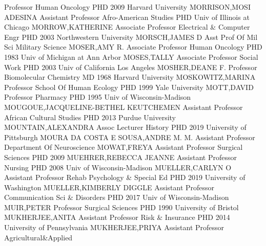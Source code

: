 \documentclass[
]{article}
\begin{document}
Professor \textbar Human Oncology \textbar{}  \textbar PHD
2009 Harvard University \textbar MORRISON,MOSI ADESINA
\textbar Assistant Professor \textbar Afro-American Studies \textbar{}
 \textbar PHD Univ of Illinois at Chicago
\textbar MORROW,KATHERINE \textbar Associate Professor
\textbar Electrical \& Computer Engr \textbar{} 
\textbar PHD 2003 Northwestern University \textbar MORSCH,JAMES D
\textbar Asst Prof Of Mil Sci \textbar Military Science \textbar{}
 \textbar MOSER,AMY R. \textbar Associate Professor
\textbar Human Oncology \textbar PHD 1983 Univ of Michigan at Ann Arbor
\textbar{}  \textbar MOSES,TALLY \textbar Associate
Professor \textbar Social Work \textbar PHD 2003 Univ of California Los
Angeles \textbar{}  \textbar MOSHER,DEANE F.
\textbar Professor \textbar Biomolecular Chemistry \textbar MD 1968
Harvard University \textbar{}  \textbar MOSKOWITZ,MARINA
\textbar Professor \textbar School Of Human Ecology \textbar PHD 1999
Yale University \textbar{}  \textbar MOTT,DAVID
\textbar Professor \textbar Pharmacy \textbar PHD 1995 Univ of
Wisconsin-Madison \textbar{} 
\textbar MOUGOUE,JACQUELINE-BETHEL KEUTCHEMEN \textbar Assistant
Professor \textbar African Cultural Studies \textbar PHD 2013 Purdue
University \textbar{}  \textbar MOUNTAIN,ALEXANDRA
\textbar Assoc Lecturer \textbar History \textbar PHD 2019 University of
Pittsburgh \textbar{}  \textbar MOURA DA COSTA E SOUSA,ANDRE
M. M. \textbar Assistant Professor \textbar Department Of Neuroscience
\textbar MOWAT,FREYA \textbar{}  \textbar Assistant
Professor \textbar Surgical Sciences \textbar PHD 2009
\textbar MUEHRER,REBECCA JEANNE \textbar{} 
\textbar Assistant Professor \textbar Nursing \textbar PHD 2008 Univ of
Wisconsin-Madison \textbar MUELLER,CARLYN O \textbar{} 
\textbar Assistant Professor \textbar Rehab Psychology \& Special Ed
\textbar PHD 2019 University of Washington \textbar MUELLER,KIMBERLY
DIGGLE \textbar{}  \textbar Assistant Professor
\textbar Communication Sci \& Disorders \textbar PHD 2017 Univ of
Wisconsin-Madison \textbar MUIR,PETER \textbar{} 
\textbar Professor \textbar Surgical Sciences \textbar PHD 1990
University of Bristol \textbar MUKHERJEE,ANITA \textbar{} 
\textbar Assistant Professor \textbar Risk \& Insurance \textbar PHD
2014 University of Pennsylvania \textbar MUKHERJEE,PRIYA \textbar{}
 \textbar Assistant Professor \textbar Agricultural\&Applied
\end{document}
